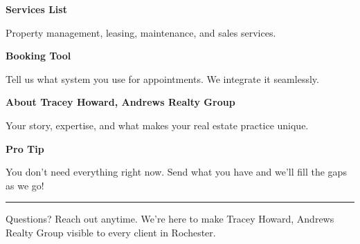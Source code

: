 \documentclass[11pt,letterpaper]{article}
\begin{document}
\hfill
\begin{minipage}[t]{0.48\textwidth}
\begin{tcolorbox}[colframe=accent-teal, boxrule=1pt, left=0.7em, right=0.7em, top=0.5em, bottom=0.5em, arc=4pt, boxsep=0pt]
{\bfseries\small\color{accent-teal}Services List}

\vspace{0.15em}

{\small Property management, leasing, maintenance, and sales services.}
\end{tcolorbox}

\vspace{0.1em}

\begin{tcolorbox}[colframe=accent-teal, boxrule=1pt, left=0.7em, right=0.7em, top=0.5em, bottom=0.5em, arc=4pt, boxsep=0pt]
{\bfseries\small\color{accent-teal}Booking Tool}

\vspace{0.15em}

{\small Tell us what system you use for appointments. We integrate it seamlessly.}
\end{tcolorbox}

\vspace{0.1em}

\begin{tcolorbox}[colframe=accent-teal, boxrule=1pt, left=0.7em, right=0.7em, top=0.5em, bottom=0.5em, arc=4pt, boxsep=0pt]
{\bfseries\small\color{accent-teal}About Tracey Howard, Andrews Realty Group}

\vspace{0.15em}

{\small Your story, expertise, and what makes your real estate practice unique.}
\end{tcolorbox}

\vspace{-0.2em}
\end{minipage}

\vspace{0.15em}

\begin{tcolorbox}[colback={accent-red!5}, colframe=accent-red!20, boxrule=0.5pt, left=0.7em, right=0.7em, top=0.4em, bottom=0.4em, arc=6pt, boxsep=0pt]

{\bfseries\small\color{accent-red}Pro Tip}

\vspace{0.1em}

{\small You don't need everything right now. Send what you have and we'll fill the gaps as we go!}

\end{tcolorbox}

\vspace{0.15em}

\noindent\hrule
\vspace{0.2em}

{\small\color{text-light}Questions? Reach out anytime. We're here to make Tracey Howard, Andrews Realty Group visible to every client in Rochester.}
\end{document}
